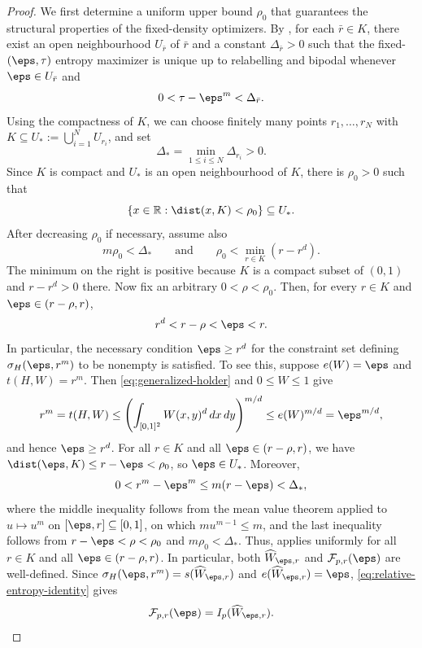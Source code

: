 \begin{proof}
We first determine a uniform upper bound $\rho_0$ that guarantees the
structural properties of the fixed-density optimizers.
By , for each $\bar r \in K$, there exist an open neighbourhood
$U_{\bar r}$ of $\bar r$ and a constant $\Delta_{\bar r}>0$ such that the
fixed-$(\eps,\tau)$ entropy maximizer is unique up to relabelling and bipodal
whenever $\eps\in U_{\bar r}$ and
\[
  0<\tau-\eps^m<\Delta_{\bar r}.
\]
Using the compactness of $K$, we can choose finitely many points
$r_1,\ldots,r_N$ with
$K\subseteq U_*:=\bigcup_{i=1}^N U_{r_i}$, and set
\[
  \Delta_*=\min_{1\le i\le N}\Delta_{r_i}>0.
\]
Since $K$ is compact and $U_*$ is an open neighbourhood of $K$, there is
$\rho_0>0$ such that
\[
  \{x\in\mathbb R:\dist(x,K)<\rho_0\}\subseteq U_*.
\]
After decreasing $\rho_0$ if necessary, assume also
\[
  m\rho_0<\Delta_*
  \qquad \text{and} \qquad
  \rho_0<\min_{r\in K}(r-r^d).
\]
The minimum on the right is positive because $K$ is a compact subset of
$(0,1)$ and $r-r^d>0$ there.  Now fix an arbitrary $0<\rho<\rho_0$.  Then, for
every
$r\in K$ and $\eps\in(r-\rho,r)$,
\[
  r^d<r-\rho<\eps<r.
\]
In particular, the necessary condition $\eps\ge r^d$ for the constraint set
defining $\sigma_H(\eps,r^m)$ to be nonempty is satisfied.  To see this,
suppose $e(W)=\eps$ and $t(H,W)=r^m$.  Then \eqref{eq:generalized-holder} and
$0\le W\le1$ give
\[
  r^m=t(H,W)
  \le \left(\int_{[0,1]^2}W(x,y)^d\,dx\,dy\right)^{m/d}
  \le e(W)^{m/d}
  =\eps^{m/d},
\]
and hence $\eps\ge r^d$.
For all $r\in K$ and all $\eps\in(r-\rho,r)$, we have
$\dist(\eps,K)\le r-\eps<\rho_0$, so $\eps\in U_*$.  Moreover,
\[
  0<r^m-\eps^m\le m(r-\eps)<\Delta_*,
\]
where the middle inequality follows from the mean value theorem applied to
$u\mapsto u^m$ on $[\eps,r]\subseteq[0,1]$, on which $mu^{m-1}\le m$,
and the last inequality follows from $r-\eps<\rho<\rho_0$ and
$m\rho_0<\Delta_*$.
Thus,  applies uniformly for all $r\in K$ and all $\eps\in(r-\rho,r)$.
In particular, both $\widehat W_{\eps,r}$ and $\mathcal F_{p,r}(\eps)$ are
well-defined.  Since
$\sigma_H(\eps,r^m)=s(\widehat W_{\eps,r})$ and
$e(\widehat W_{\eps,r})=\eps$, \eqref{eq:relative-entropy-identity} gives
\[
  \mathcal{F}_{p,r}(\eps)=I_p(\widehat W_{\eps,r}).
\]


\end{proof}
